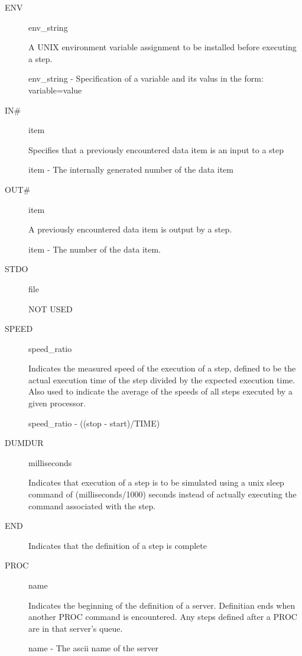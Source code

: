 \begin{itemize}
\begin{description}
\item[ENV]    env\_string
      
 A UNIX environment variable assignment to be installed before executing
       a step.

       env\_string - Specification of a variable and its valus in the form:
                    variable=value

\item[IN#]    item

       Specifies that a previously encountered data item is an input to a step
       
item - The internally generated number of the data item

\item[OUT#]   item

       A previously encountered data item is output by a step.
      
item - The number of the data item.

\item[STDO]   file

       NOT USED

\item[SPEED]  speed\_ratio

       Indicates the measured speed of the execution of a step, defined to be
       the actual execution time of the step divided by the expected execution
       time.  Also used to indicate the average of the speeds of all steps
       executed by a given processor.
       
speed\_ratio - ((stop - start)/TIME)

\item[DUMDUR] milliseconds

       Indicates that execution of a step is to be simulated using a unix sleep
       command of (milliseconds/1000) seconds instead of actually executing the
       command associated with the step.

\item[END]

       Indicates that the definition of a step is complete

\item[PROC]   name
       
Indicates the beginning of the definition of a server.  Definitian ends
       when another PROC command is encountered.  Any steps defined after a
       PROC are in that server's queue.

       name - The ascii name of the server


\end{description}
\end{itemize}
